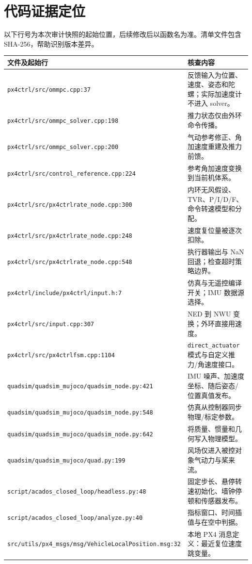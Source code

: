 \documentclass[UTF8,a4paper,11pt,fontset=fandol]{ctexart}
\newcommand{\code}[1]{{\small\nolinkurl{#1}}}
\begin{document}
\section{代码证据定位}
以下行号为本次审计快照的起始位置，后续修改后以函数名为准。清单文件包含 SHA-256，帮助识别版本差异。
\begin{longtable}{L{7.5cm}L{7.7cm}}
\toprule 文件及起始行 & 核查内容\\\midrule\endhead
\code{px4ctrl/src/ommpc.cpp:37} & 反馈输入为位置、速度、姿态和陀螺；实际加速度计不进入 solver。\\
\code{px4ctrl/src/ommpc_solver.cpp:198} & 推力状态仅由外环命令传播。\\
\code{px4ctrl/src/ommpc_solver.cpp:200} & 气动参考修正、角加速度重建及推力前馈。\\
\code{px4ctrl/src/control_reference.cpp:224} & 参考角加速度变换到当前机体系。\\
\code{px4ctrl/src/px4ctrlrate_node.cpp:300} & 内环无风假设、TVR、P/I/D/F、命令转速模型和分配。\\
\code{px4ctrl/src/px4ctrlrate_node.cpp:248} & 速度复位量被逐次扣除。\\
\code{px4ctrl/src/px4ctrlrate_node.cpp:548} & 执行器输出与 NaN 回退；检查超时策略边界。\\
\code{px4ctrl/include/px4ctrl/input.h:7} & 仿真与无遥控编译开关；IMU 数据源选择。\\
\code{px4ctrl/src/input.cpp:307} & NED 到 NWU 变换；外环直接用速度。\\
\code{px4ctrl/src/px4ctrlfsm.cpp:1104} & \code{direct_actuator} 模式与自定义推力/角速度接口。\\
\code{quadsim/quadsim_mujoco/quadsim_node.py:421} & IMU 噪声、加速度坐标、随后姿态/位置真值发布。\\
\code{quadsim/quadsim_mujoco/quadsim_node.py:548} & 仿真从控制器同步物理/标定参数。\\
\code{quadsim/quadsim_mujoco/quadsim_node.py:642} & 将质量、惯量和几何写入物理模型。\\
\code{quadsim/quadsim_mujoco/quad.py:199} & 风场仅进入被控对象气动力与桨来流。\\
\code{script/acados_closed_loop/headless.py:48} & 固定步长、悬停转速初始化、墙钟停顿和传感器发布。\\
\code{script/acados_closed_loop/analyze.py:40} & 指标窗口、时间插值与在空中判据。\\
\code{src/utils/px4_msgs/msg/VehicleLocalPosition.msg:32} & 本地 PX4 消息定义：最近复位速度跳变量。\\
\bottomrule\end{longtable}
\end{document}
